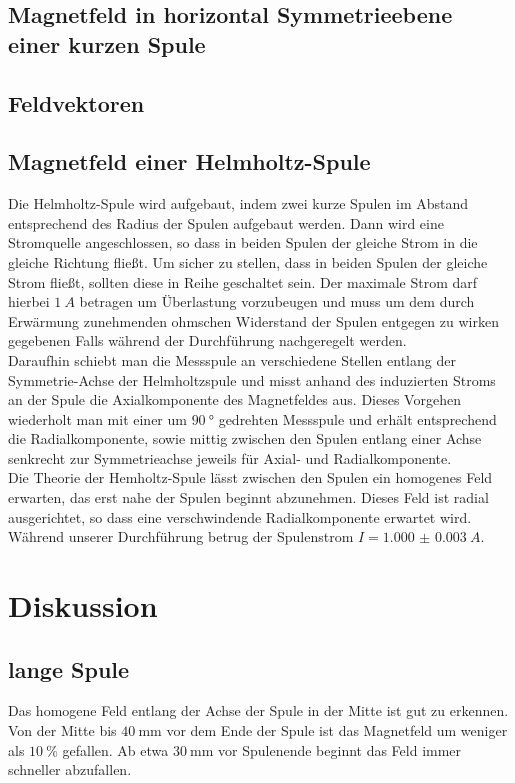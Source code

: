 \subsection{Magnetfeld in horizontal Symmetrieebene einer kurzen Spule}

\subsection{Feldvektoren}

\subsection{Magnetfeld einer Helmholtz-Spule}
Die Helmholtz-Spule wird aufgebaut, indem zwei kurze Spulen im Abstand entsprechend des Radius der Spulen aufgebaut werden. Dann wird eine Stromquelle angeschlossen, so dass in beiden Spulen der gleiche Strom in die gleiche Richtung fließt. Um sicher zu stellen, dass in beiden Spulen der gleiche Strom fließt, sollten diese in Reihe geschaltet sein. Der maximale Strom darf hierbei $ \SI{1}{A} $ betragen um Überlastung vorzubeugen und muss um dem durch Erwärmung zunehmenden ohmschen Widerstand der Spulen entgegen zu wirken gegebenen Falls während der Durchführung nachgeregelt werden. \\
Daraufhin schiebt man die Messspule an verschiedene Stellen entlang der Symmetrie-Achse der Helmholtzspule und misst anhand des induzierten Stroms an der Spule die Axialkomponente des Magnetfeldes aus. Dieses Vorgehen wiederholt man mit einer um $ \SI{90}{\degree} $ gedrehten Messspule und erhält entsprechend die Radialkomponente, sowie mittig zwischen den Spulen entlang einer Achse senkrecht zur Symmetrieachse jeweils für Axial- und Radialkomponente.\\
Die Theorie der Hemholtz-Spule lässt zwischen den Spulen ein homogenes Feld erwarten, das erst nahe der Spulen beginnt abzunehmen. Dieses Feld ist radial ausgerichtet, so dass eine verschwindende Radialkomponente erwartet wird. \\
Während unserer Durchführung betrug der Spulenstrom $ I= \SI{1.000(3)}{A} $.

\section{Diskussion}
\subsection{lange Spule}
Das homogene Feld entlang der Achse der Spule in der Mitte ist gut zu erkennen. Von der Mitte bis $ \SI{40}{\milli\meter} $ vor dem Ende der Spule ist das Magnetfeld um weniger als $ \SI{10}{\percent} $ gefallen. Ab etwa $ \SI{30}{\milli\meter} $ vor Spulenende beginnt das Feld immer schneller abzufallen. %
